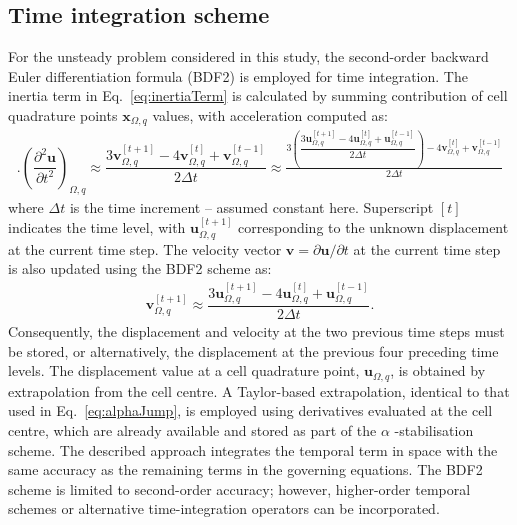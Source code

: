 \documentclass[sn-mathphys,Numbered]{sn-jnl}%
\newcommand{\bb}{\boldsymbol}
\begin{document}
\begin{appendices}
\section{Time integration scheme}
\label{app:time}
%
%
For the unsteady problem considered in this study, the second-order backward Euler differentiation formula (BDF2) is employed for time integration. The inertia term in Eq.~\eqref{eq:inertiaTerm} is calculated by summing contribution of cell quadrature points $\bb{x}_{\Omega, q}$ values, with acceleration computed as:
%
\begin{eqnarray} \label{eq:inertia2}. 	\left(\dfrac{\partial^2 \boldsymbol{u}}{\partial t^2}\right)_{\Omega, q}
 	\approx
 	\dfrac{3\boldsymbol{v}_{\Omega, q}^{[t+1]} - 4\boldsymbol{v}_{\Omega, q}^{[t]} + \boldsymbol{v}_{\Omega, q}^{[t-1]}}{2\Delta t}
 	\approx
 	\frac{3\left(
 		\dfrac{3\boldsymbol{u}_{\Omega, q}^{[t+1]} - 4\boldsymbol{u}_{\Omega, q}^{[t]} + \boldsymbol{u}_{\Omega, q}^{[t-1]}}{2\Delta t}
 		\right)
 	- 4\boldsymbol{v}_{\Omega, q}^{[t]} + \boldsymbol{v}_{\Omega, q}^{[t-1]}}{2\Delta t}
\end{eqnarray}
%
where $\Delta t$ is the time increment -- assumed constant here.
Superscript $[t]$ indicates the time level, with $\bb{u}_{\Omega, q}^{[t+1]}$ corresponding to the unknown displacement at the current time step.
The velocity vector $\bb{v} = \partial \bb{u}/\partial t$ at the current time step is also updated using the BDF2 scheme as:
%
\begin{eqnarray}
 	\boldsymbol{v}_{\Omega, q}^{[t+1]}	\approx
 		\dfrac{3\boldsymbol{u}_{\Omega, q}^{[t+1]} - 4\boldsymbol{u}_{\Omega, q}^{[t]} + \boldsymbol{u}_{\Omega, q}^{[t-1]}}{2\Delta t}.
\end{eqnarray}
%
Consequently, the displacement and velocity at the two previous time steps must be stored, or alternatively, the displacement at the previous  four preceding time levels.
The displacement value at a cell quadrature point, $\boldsymbol{u}_{\Omega,q}$, is obtained by extrapolation from the cell centre. A Taylor-based extrapolation, identical to that used in Eq.~\eqref{eq:alphaJump}, is employed using derivatives evaluated at the cell centre, which are already available and stored as part of the $\alpha$ -stabilisation scheme. 
The described approach integrates the temporal term in space with the same accuracy as the remaining terms in the governing equations. The BDF2 scheme is limited to second-order accuracy; however, higher-order temporal schemes or alternative time-integration operators \cite{Costa2022b} can be incorporated.
%
%

\end{appendices}
\end{document}
